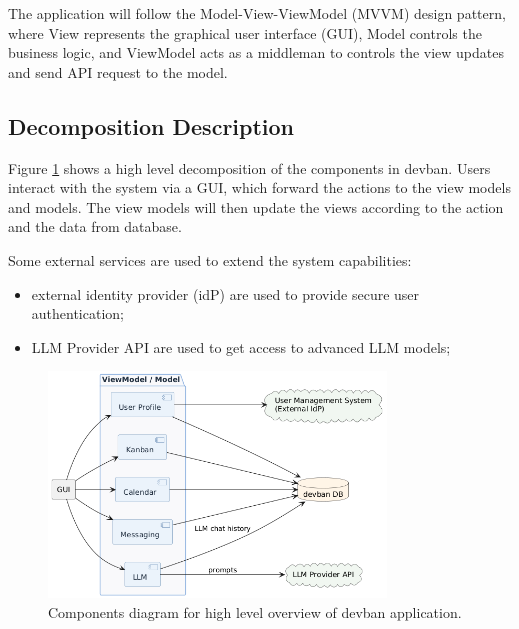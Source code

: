 \documentclass[11pt]{article}
\begin{document}
The application will follow the Model-View-ViewModel (MVVM) design pattern, where
View represents the graphical user interface (GUI), Model controls the business logic, and
ViewModel acts as a middleman to controls the view updates and send API request to the model.

\subsection{Decomposition Description}
Figure \ref{fig:decomposition_description} shows a high level decomposition of the components in devban. 
Users interact with the system via a GUI, which forward the actions to the view models and models.
The view models will then update the views according to the action and the data from database.

Some external services are used to extend the system capabilities:
\begin{itemize}%
    \item external identity provider (idP) are used to provide secure user authentication;
    \item LLM Provider API are used to get access to advanced LLM models;
\end{itemize}

\begin{figure}[h]
    \centering
    \includegraphics[width=0.8\textwidth]{assets/system_architecture/system_architecture.png}
    \caption{Components diagram for high level overview of devban application.}
    \label{fig:decomposition_description}
\end{figure}


\end{document}
